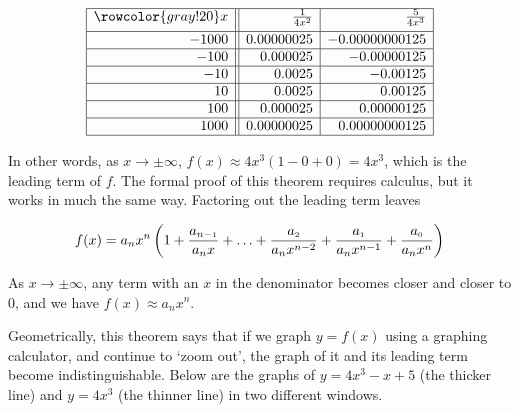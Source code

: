 \documentclass{ximera}
\begin{document}
\renewcommand*{\arraystretch}{2}
\setlength{\arrayrulewidth}{0.5mm}
\setlength{\tabcolsep}{18pt}
\[ 
\begin{array}{|r||r|r|}  

\hline 
\rowcolor{gray!20}
 x & \frac{1}{4x^2} & \frac{5}{4x^3} \\[4pt] \hline
-1000  & 0.00000025 & -0.00000000125 \\  \hline
-100  & 0.000025 & -0.00000125 \\  \hline
-10 & 0.0025 & -0.00125 \\  \hline
10  & 0.0025 & 0.00125 \\  \hline
100 & 0.000025 & 0.00000125 \\  \hline
1000 & 0.00000025 & 0.00000000125 \\  \hline
\end{array} \]

\smallskip

In other words, as $x \rightarrow \pm \infty$, $f(x) \approx 4x^3\left( 1 - 0 +0\right) = 4x^3$, which is the leading term of $f$.  The formal proof of this theorem requires calculus, but it works in much the same way.  Factoring out the leading term leaves

\[ f(x) = a_{n} x^{n} \left( 1 + \dfrac{a_{n-\mbox{\tiny$1$}}}{a_{n} x}+ \ldots + \dfrac{a_{\mbox{\tiny$2$}}}{a_{n} x^{n-2}} + \dfrac{a_{\mbox{\tiny$1$}}}{a_{n} x^{n-1}}+\dfrac{a_{\mbox{\tiny$0$}}}{a_{n} x^{n}}\right)\]

As $x \rightarrow \pm \infty$, any term with an $x$ in the denominator becomes closer and closer to $0$, and we have $f(x) \approx a_{n} x^{n}$.  

Geometrically, this theorem says that if we graph $y=f(x)$ using a graphing calculator, and continue to `zoom out', the graph of it and its leading term become indistinguishable.  Below are the graphs of $y=4x^3-x+5$ (the thicker line) and $y=4x^3$ (the thinner line) in two different windows.
\end{document}
